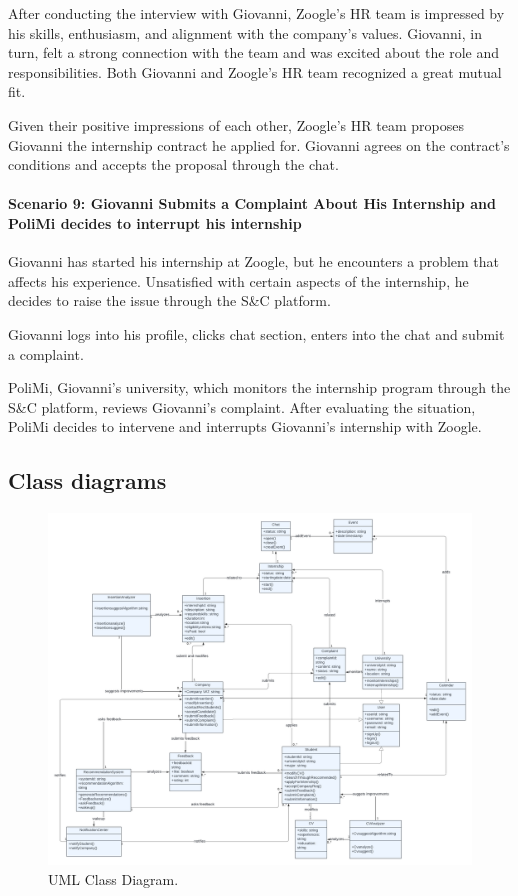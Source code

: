 After conducting the interview with Giovanni, Zoogle's HR team is
impressed by his skills, enthusiasm, and alignment with the company's
values. Giovanni, in turn, felt a strong connection with the team and
was excited about the role and responsibilities. Both Giovanni and
Zoogle's HR team recognized a great mutual fit.

Given their positive impressions of each other, Zoogle's HR team
proposes Giovanni the internship contract he applied for. Giovanni
agrees on the contract's conditions and accepts the proposal through the
chat.


\paragraph{Scenario 9: Giovanni Submits a Complaint About His Internship
and PoliMi decides to interrupt his internship}

Giovanni has started his internship at Zoogle, but he encounters a
problem that affects his experience. Unsatisfied with certain aspects of
the internship, he decides to raise the issue through the S\&C platform.

Giovanni logs into his profile, clicks chat section, enters into the
chat and submit a complaint.~

PoliMi, Giovanni's university, which monitors the internship program
through the S\&C platform, reviews Giovanni's complaint.
After evaluating the situation, PoliMi decides to intervene and
interrupts Giovanni's internship with Zoogle.


\subsection{Class diagrams}
\label{subsec:class_diagrams}%


\begin{figure}[H]
    \begin{center}
        \includegraphics[width=\linewidth]{Images/ClassDiagram/UMLClass.png}
        \caption{UML Class Diagram.}
        \label{fig:UML_class_diag}%
    \end{center}
\end{figure}


